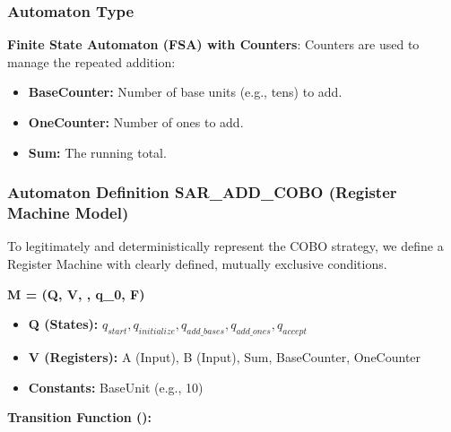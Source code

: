 \documentclass[11pt]{article}
\begin{document}
\subsubsection*{Automaton Type}
\textbf{Finite State Automaton (FSA) with Counters}:  
Counters are used to manage the repeated addition:
\begin{itemize}
    \item \textbf{BaseCounter:} Number of base units (e.g., tens) to add.
    \item \textbf{OneCounter:} Number of ones to add.
    \item \textbf{Sum:} The running total.
\end{itemize}

\subsubsection*{Automaton Definition SAR\_ADD\_COBO (Register Machine Model)}

To legitimately and deterministically represent the COBO strategy, we define a Register Machine with clearly defined, mutually exclusive conditions.

\textbf{M = (Q, V, \delta, q_0, F)}

\begin{itemize}
    \item \textbf{Q (States):} {$q_{start}, q_{initialize}, q_{add\_bases}, q_{add\_ones}, q_{accept}$}
    \item \textbf{V (Registers):} {A (Input), B (Input), Sum, BaseCounter, OneCounter}
    \item \textbf{Constants:} BaseUnit (e.g., 10)
\end{itemize}

\textbf{Transition Function (\delta):}
\end{document}
